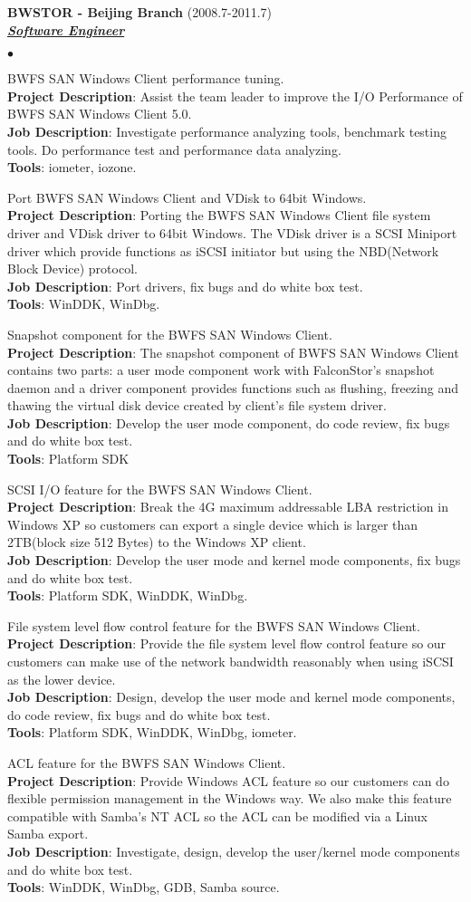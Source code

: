 \documentclass{article}
\newcommand{\employer}[3]{{ \textbf{#1} (#2)\\ \underline{\textbf{\emph{#3}}}\\}}
\newcommand{\project}[4]{{#1}\\ \textbf{Project Description}:
  {#2}\\ \textbf{Job Description}: {#3}\\ \textbf{Tools}: {#4}\vspace*{3pt}}
\newenvironment{achievements}{\begin{list}{$\bullet$}{\topsep 0pt \itemsep -2pt}}{\vspace*{6pt}\end{list}}
\begin{document}
\employer{BWSTOR - Beijing Branch}{2008.7-2011.7}{Software Engineer}
\begin{achievements}
\item 
  \project{BWFS SAN Windows Client performance tuning.}
          {Assist the team leader to improve the I/O Performance of BWFS SAN Windows Client 5.0.}
          {Investigate performance analyzing tools, benchmark testing tools. Do performance test and performance data analyzing.}
          {iometer, iozone.}

\item 
  \project{Port BWFS SAN Windows Client and VDisk to 64bit Windows.}
          {Porting the BWFS SAN Windows Client file system driver and VDisk driver to 64bit Windows. The VDisk driver is a SCSI Miniport driver which provide functions as iSCSI initiator but using the NBD(Network Block Device) protocol.}
          {Port drivers, fix bugs and do white box test.}
          {WinDDK, WinDbg.}

\item 
  \project{Snapshot component for the BWFS SAN Windows Client.}
          {The snapshot component of BWFS SAN Windows Client contains two parts: a user mode component work with FalconStor's snapshot daemon and a driver component provides functions such as flushing, freezing and thawing the virtual disk device created by client's file system driver.}
          {Develop the user mode component, do code review, fix bugs and do white box test.}
          {Platform SDK}

\item 
  \project{SCSI I/O feature for the BWFS SAN Windows Client.}
          {Break the 4G maximum addressable LBA restriction in Windows XP so customers can export a single device which is larger than 2TB(block size 512 Bytes) to the Windows XP client.}
          {Develop the user mode and kernel mode components, fix bugs and do white box test.}
          {Platform SDK, WinDDK, WinDbg.}

\item 
  \project{File system level flow control feature for the BWFS SAN Windows Client.}
          {Provide the file system level flow control feature so our customers can make use of the network bandwidth reasonably when using iSCSI as the lower device.}
          {Design, develop the user mode and kernel mode components, do code review, fix bugs and do white box test.}
          {Platform SDK, WinDDK, WinDbg, iometer.}

\item 
  \project{ACL feature for the BWFS SAN Windows Client.}
          {Provide Windows ACL feature so our customers can do flexible permission management in the Windows way. We also make this feature compatible with Samba's NT ACL so the ACL can be modified via a Linux Samba export.}
          {Investigate, design, develop the user/kernel mode components and do white box test.}
          {WinDDK, WinDbg, GDB, Samba source.}


\end{achievements}
\end{document}
